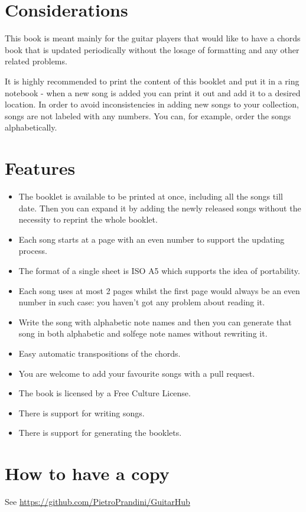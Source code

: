 \section*{Considerations}
This book is meant mainly for the guitar players that would like to have a chords book that is updated periodically without the losage of formatting and any other related problems.\par
It is highly recommended to print the content of this booklet and put it in a ring notebook - when a new song is added you can print it out and add it to a desired location. In order to avoid inconsistencies in adding new songs to your collection, songs are not labeled with any numbers. You can, for example, order the songs alphabetically.\par

\section*{Features}
\begin{itemize}
\item The booklet is available to be printed at once, including all the songs till date. Then you can expand it by adding the newly released songs without the necessity to reprint the whole booklet.
\item Each song starts at a page with an even number to support the updating process.
\item The format of a single sheet is ISO A5 which supports the idea of  portability.
\item Each song uses at most 2 pages whilst the first page would always be an even number in such case: you haven't got any problem about reading it.
\item Write the song with alphabetic note names and then you can generate that song in both alphabetic and solfege note names without rewriting it.
\item Easy automatic transpositions of the chords.
\item You are welcome to add your favourite songs with a pull request.
\item The book is licensed by a Free Culture License.
\item There is support for writing songs.
\item There is support for generating the booklets.
\end{itemize}

\section*{How to have a copy}
See \href{https://github.com/PietroPrandini/GuitarHub}{https://github.com/PietroPrandini/GuitarHub}

\begin{center}
\end{center}
